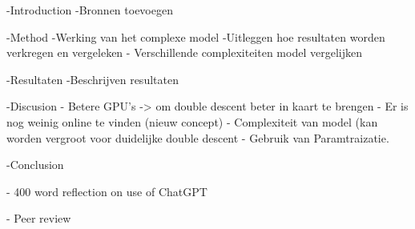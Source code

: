 -Introduction
    -Bronnen toevoegen

-Method
    -Werking van het complexe model
    -Uitleggen hoe resultaten worden verkregen en vergeleken
        - Verschillende complexiteiten model vergelijken 

-Resultaten
    -Beschrijven resultaten

-Discusion
    - Betere GPU’s -> om double descent beter in kaart te brengen
    - Er is nog weinig online te vinden (nieuw concept)
    - Complexiteit van model (kan worden vergroot voor      duidelijke double descent
        - Gebruik van Paramtraizatie.

-Conclusion

- 400 word reflection on use of ChatGPT

- Peer review